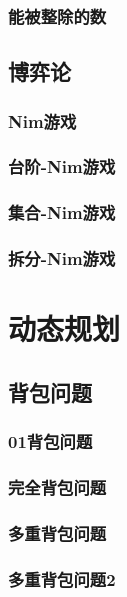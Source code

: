 \documentclass[10pt,a4paper]{article}
\begin{document}
\subsubsection{能被整除的数}

\subsection{博弈论}
\subsubsection{Nim游戏}

\subsubsection{台阶-Nim游戏}

\subsubsection{集合-Nim游戏}

\subsubsection{拆分-Nim游戏}

\section{动态规划}
\subsection{背包问题}
\subsubsection{01背包问题}

\subsubsection{完全背包问题}

\subsubsection{多重背包问题}

\subsubsection{多重背包问题2}

\end{document}
